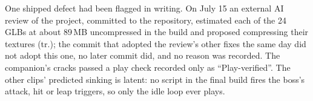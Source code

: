One shipped defect had been flagged in writing. On July 15 an external AI review of
the project, committed to the repository, estimated each of the 24 GLBs at about
89\,MB uncompressed in the build and proposed compressing their textures (tr.);
the commit that adopted the review's other fixes the same day did not adopt this
one, no later commit did, and no reason was recorded. The companion's cracks
passed a play check recorded only as ``Play-verified''. The other clips'
predicted sinking is latent: no script in the final build fires the boss's
attack, hit or leap triggers, so only the idle loop ever plays.
